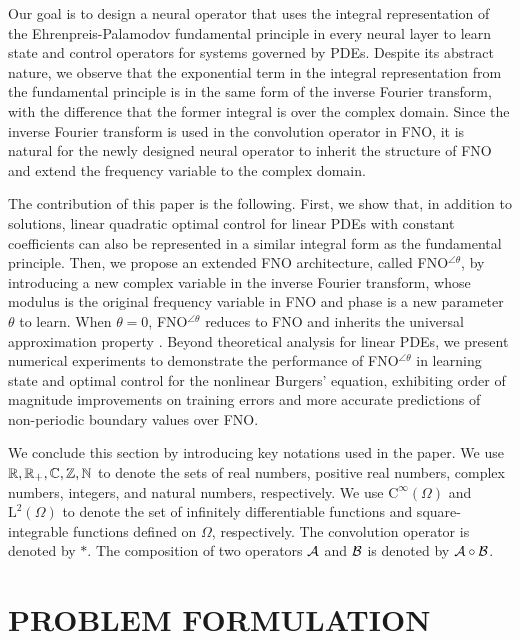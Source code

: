 \documentclass[letterpaper, 10 pt, conference]{ieeeconf}  %
\begin{document}
Our goal is to design a neural operator that uses the integral representation of the Ehrenpreis-Palamodov fundamental principle in every neural layer to learn state and control operators for systems governed by PDEs.
Despite its abstract nature, we observe that the exponential term in the integral representation from the fundamental principle is in the same form of the inverse Fourier transform, with the difference that the former integral is over the complex domain.
Since the inverse Fourier transform is used in the convolution operator in FNO, it is natural for the newly designed neural operator to inherit the structure of FNO and extend the frequency variable to the complex domain.

The contribution of this paper is the following. First, we show that, in addition to solutions, linear quadratic optimal control for linear PDEs with constant coefficients can also be represented in a similar integral form as the fundamental principle.
Then, we propose an extended FNO architecture, called FNO$^{\angle \theta}$, by introducing a new complex variable in the inverse Fourier transform, whose modulus is the original frequency variable in FNO and phase is a new parameter $\theta$ to learn.
When $\theta=0$, FNO$^{\angle \theta}$ reduces to FNO and inherits the universal approximation property \cite{kovachki2021universal}.
Beyond theoretical analysis for linear PDEs, we present numerical experiments to demonstrate the performance of FNO$^{\angle \theta}$ in learning state and optimal control for the nonlinear Burgers' equation, exhibiting order of magnitude improvements on training errors and more accurate predictions of non-periodic boundary values over FNO.

We conclude this section by introducing key notations used in the paper. We use $\mathbb{R}, \mathbb{R}_+, \mathbb{C}, \mathbb{Z}, \mathbb{N}$ to denote the sets of real numbers, positive real numbers, complex numbers, integers, and natural numbers, respectively.
We use $\text{C}^\infty(\Omega)$ and $\text{L}^2(\Omega)$ to denote the set of infinitely differentiable functions and square-integrable functions defined on $\Omega$, respectively.
The convolution operator is denoted by $\ast$.
The composition of two operators $\mathcal A$ and $\mathcal B$ is denoted by $\mathcal A \circ \mathcal B$.


\section{PROBLEM FORMULATION}
\end{document}
